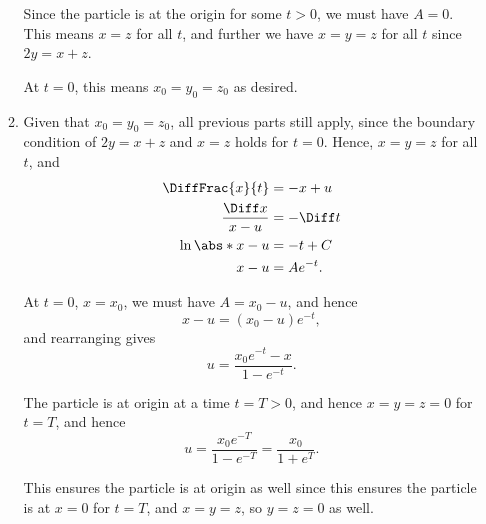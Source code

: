 \begin{enumerate}
\begin{enumerate}
                    Since the particle is at the origin for some \(t > 0\), we must have \(A = 0\). This means \(x = z\) for all \(t\), and further we have \(x = y = z\) for all \(t\) since \(2y = x + z\).

                    At \(t = 0\), this means \(x_0 = y_0 = z_0\) as desired.

              \item Given that \(x_0 = y_0 = z_0\), all previous parts still apply, since the boundary condition of \(2y = x + z\) and \(x = z\) holds for \(t = 0\). Hence, \(x = y = z\) for all \(t\), and
                    \begin{align*}
                        \DiffFrac{x}{t}       & = -x + u    \\
                        \frac{\Diff x}{x - u} & = - \Diff t \\
                        \ln \abs*{x - u}      & = -t + C    \\
                        x - u                 & = A e^{-t}.
                    \end{align*}

                    At \(t = 0\), \(x = x_0\), we must have \(A = x_0 - u\), and hence
                    \[
                        x - u = (x_0 - u) e^{-t},
                    \]
                    and rearranging gives
                    \[
                        u = \frac{x_0 e^{-t} - x}{1 - e^{-t}}.
                    \]

                    The particle is at origin at a time \(t = T > 0\), and hence \(x = y = z = 0\) for \(t = T\), and hence
                    \[
                        u = \frac{x_0 e^{-T}}{1 - e^{-T}} = \frac{x_0}{1 + e^{T}}.
                    \]

                    This ensures the particle is at origin as well since this ensures the particle is at \(x = 0\) for \(t = T\), and \(x = y = z\), so \(y = z = 0\) as well.
          \end{enumerate}
\end{enumerate}